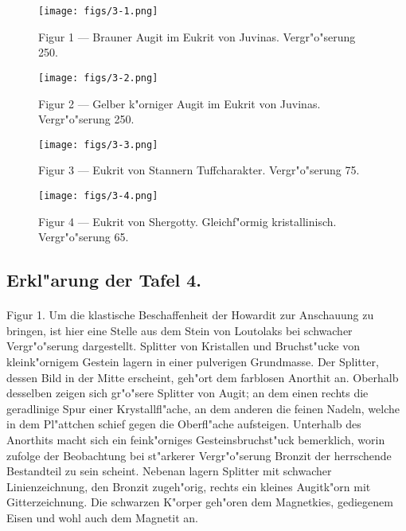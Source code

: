 \documentclass[a4paper, 11pt, oneside, polutonikogreek, german]{article}
\begin{document}
\vspace*{\fill}
\begin{figure}[H]
\centering
\texttt{[image: figs/3-1.png]}
\caption{\small Figur 1 --- Brauner Augit im Eukrit von Juvinas. Vergr"o"serung 250.}
\end{figure}
\vspace*{\fill}
\clearpage

\vspace*{\fill}
\begin{figure}[H]
\centering
\texttt{[image: figs/3-2.png]}
\caption{\small Figur 2 --- Gelber k"orniger Augit im Eukrit von Juvinas. Vergr"o"serung 250.}
\end{figure}
\vspace*{\fill}
\clearpage

\vspace*{\fill}
\begin{figure}[H]
\centering
\texttt{[image: figs/3-3.png]}
\caption{\small Figur 3 --- Eukrit von Stannern Tuffcharakter. Vergr"o"serung 75.}
\end{figure}
\vspace*{\fill}
\clearpage

\vspace*{\fill}
\begin{figure}[H]
\centering
\texttt{[image: figs/3-4.png]}
\caption{\small Figur 4 --- Eukrit von Shergotty. Gleichf"ormig kristallinisch. Vergr"o"serung 65.}
\end{figure}
\vspace*{\fill}
\clearpage

\subsection{Erkl"arung der Tafel 4.}
\paragraph{}
Figur 1. Um die klastische Beschaffenheit der Howardit zur Anschauung zu bringen, ist hier eine Stelle aus dem Stein von Loutolaks bei schwacher Vergr"o"serung dargestellt. Splitter von Kristallen und Bruchst"ucke von kleink"ornigem Gestein lagern in einer pulverigen Grundmasse. Der Splitter, dessen Bild in der Mitte erscheint, geh"ort dem farblosen Anorthit an. Oberhalb desselben zeigen sich gr"o"sere Splitter von Augit; an dem einen rechts die geradlinige Spur einer Krystallfl"ache, an dem anderen die feinen Nadeln, welche in dem Pl"attchen schief gegen die Oberfl"ache aufsteigen. Unterhalb des Anorthits macht sich ein feink"orniges Gesteinsbruchst"uck bemerklich, worin zufolge der Beobachtung bei st"arkerer Vergr"o"serung Bronzit der herrschende Bestandteil zu sein scheint. Nebenan lagern Splitter mit schwacher Linienzeichnung, den Bronzit zugeh"orig, rechts ein kleines Augitk"orn mit Gitterzeichnung. Die schwarzen K"orper geh"oren dem Magnetkies, gediegenem Eisen und wohl auch dem Magnetit an.
\end{document}

